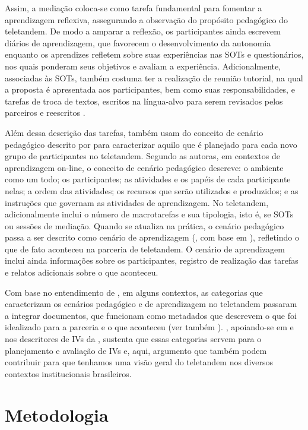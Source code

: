 \documentclass[portuguese]{textolivre}
\begin{document}
Assim, a mediação coloca-se como tarefa fundamental para fomentar a aprendizagem reflexiva, assegurando a observação do propósito pedagógico do teletandem. De modo a amparar a reflexão, os participantes ainda escrevem diários de aprendizagem, que favorecem o desenvolvimento da autonomia enquanto os aprendizes refletem sobre suas experiências nas SOTs e questionários, nos quais ponderam seus objetivos e avaliam a experiência. Adicionalmente, associadas às SOTs, também costuma ter a realização de reunião tutorial, na qual a proposta é apresentada aos participantes, bem como suas responsabilidades, e tarefas de troca de textos, escritos na língua-alvo para serem revisados pelos parceiros e reescritos \cite{aranha2014}.

Além dessa descrição das tarefas, \cite{aranha2017} também usam do conceito de cenário pedagógico descrito por \textcite{chanier2016} para caracterizar aquilo que é planejado para cada novo grupo de participantes no teletandem. Segundo as autoras, em contextos de aprendizagem on-line, o conceito de cenário pedagógico descreve: o ambiente como um todo; os participantes; as atividades e os papéis de cada participante nelas; a ordem das atividades; os recursos que serão utilizados e produzidos; e as instruções que governam as atividades de aprendizagem. No teletandem, adicionalmente inclui o número de macrotarefas e sua tipologia, isto é, se SOTs ou sessões de mediação. Quando se atualiza na prática, o cenário pedagógico passa a ser descrito como cenário de aprendizagem (\textcite{aranha2017}, com base em \textcite{foucher2010}), refletindo o que de fato aconteceu na parceria de teletandem. O cenário de aprendizagem inclui ainda informações sobre os participantes, registro de realização das tarefas e relatos adicionais sobre o que aconteceu.

Com base no entendimento de \textcite{aranha2017}, em alguns contextos, as categorias que caracterizam os cenários pedagógico e de aprendizagem no teletandem passaram a integrar documentos, que funcionam como metadados que descrevem o que foi idealizado para a parceria e o que aconteceu (ver também \textcite{lopes2019}). \textcite{rampazzamoore2024b}, apoiando-se em \textcite{aranha2017} e nos descritores de IVs da \textcite{stevens2021}, sustenta que essas categorias servem para o planejamento e avaliação de IVs e, aqui, argumento que também podem contribuir para que tenhamos uma visão geral do teletandem nos diversos contextos institucionais brasileiros.


\section{Metodologia}\label{metodologia}
\end{document}
